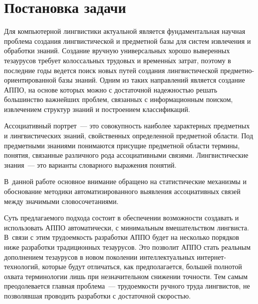 

      \thispagestyle{headings}

      \begin{multicols}{2}

            \label{st\stat}
      
    \section{Постановка задачи}
     
     Для компьютерной лингвистики актуальной является 
фундаментальная научная проблема создания лингвистической и 
предметной базы для систем извлечения и обработки знаний. Создание 
вручную универсальных хорошо выверенных тезаурусов требует 
колоссальных трудовых и временн$\acute{\mbox{ы}}$х затрат, поэтому в последние годы 
ведется поиск новых путей создания лингвистической пред\-мет\-но-ори\-ен\-ти\-ро\-ван\-ной 
базы знаний. Одним из таких направлений является 
создание АППО, на 
основе которых можно с достаточной надежностью решать большинство 
важнейших проблем, связанных с информационным поиском, извлечением 
структур знаний и построением классификаций. 
     
     Ассоциативный портрет~--- это совокупность наиболее характерных 
предметных и лингвистических знаний, свойственных определенной 
предметной области. Под предметными знаниями понимаются присущие 
предметной области термины, понятия, связанные различного рода 
ассоциативными связями. Лингвистические знания~--- это варианты 
словарного выражения понятий. 

В~данной работе основное внимание 
обращено на статистические механизмы и обоснование методики 
автоматизированного выявления ассоциативных связей между значимыми 
словосочетаниями.
     
     Суть предлагаемого подхода состоит в обеспечении возможности 
создавать и использовать АППО автоматически, с минимальным 
вмешательством лингвиста. В~связи с этим трудоемкость разработки 
АППО будет на несколько порядков ниже разработки традиционных 
тезаурусов. Это позволит АППО стать реальным дополнением тезаурусов 
в новом поколении интеллектуальных ин\-тер\-нет-тех\-но\-ло\-гий, 
которые будут отличаться, как предполагается, большей полнотой охвата 
терминологии лишь при незначительном снижении точности. Тем самым 
преодолевается главная проблема~--- трудоемкости ручного труда 
лингвистов, не позволявшая проводить разработки с достаточной 
скоростью.
     

\end{multicols}

